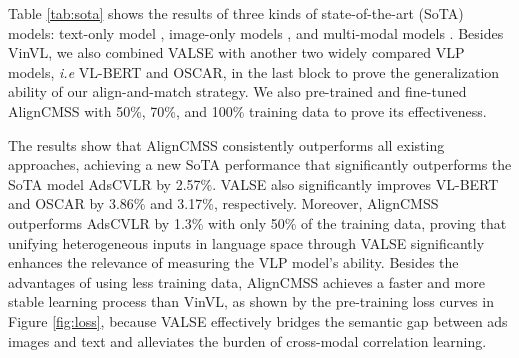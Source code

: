 \documentclass[letterpaper]{article} \usepackage{aaai24}  \usepackage{times}  \usepackage{helvet}  \usepackage{courier}  \usepackage[hyphens]{url}  \usepackage{graphicx} \urlstyle{rm} \def\UrlFont{\rm}  \usepackage{natbib}  \usepackage{caption} \frenchspacing  \setlength{\pdfpagewidth}{8.5in}  \setlength{\pdfpageheight}{11in}
\begin{document}
Table \ref{tab:sota} shows the results of three kinds of state-of-the-art (SoTA) models: text-only model \cite{devlin2019bert},  image-only models \cite{radford2021learning, pmlr-v139-kim21k, Li_Duan_Fang_Gong_Jiang_2020}, and multi-modal models \cite{su2020vl-bert, li2020oscar, 10.1145/3503161.3548226, zhang2021vinvl, NEURIPS2021_50525975, pmlr-v162-li22n}. Besides VinVL, we also combined VALSE with another two widely compared VLP models, \textit{i.e} VL-BERT and OSCAR, in the last block to prove the generalization ability of our align-and-match strategy. We also pre-trained and fine-tuned AlignCMSS with 50\%, 70\%, and 100\% training data to prove its effectiveness.

The results show that AlignCMSS consistently outperforms all existing approaches, achieving a new SoTA performance that significantly outperforms the SoTA model AdsCVLR by 2.57\%. VALSE also significantly improves VL-BERT and OSCAR by 3.86\% and 3.17\%, respectively. Moreover, AlignCMSS outperforms AdsCVLR by 1.3\% with only 50\% of the training data, proving that unifying heterogeneous inputs in language space through VALSE significantly enhances the relevance of measuring the VLP model's ability.
Besides the advantages of using less training data, AlignCMSS achieves a faster and more stable learning process than VinVL, as shown by the pre-training loss curves in Figure \ref{fig:loss}, because VALSE effectively bridges the semantic gap between ads images and text and alleviates the burden of cross-modal correlation learning.
\end{document}
